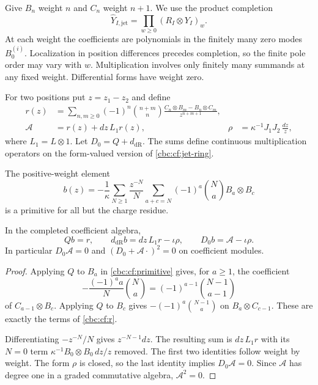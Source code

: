 Give $B_n$ weight $n$ and $C_n$ weight $n+1$. We use the
product completion
\begin{equation}\label{cbc:cf:jet-ring}
 \widehat Y_{I,\mathrm{jet}}
       =\prod_{w\geq0}(R_I\otimes Y_I)_w.
\end{equation}
At each weight the coefficients are polynomials in the finitely
many zero modes $B_0^{(i)}$. Localization in position differences
precedes completion, so the finite pole order may vary with $w$.
Multiplication involves only finitely many summands at any fixed
weight. Differential forms have weight zero.

For two positions put $z=z_1-z_2$ and define
\begin{align}
 r(z)&=\sum_{n,m\geq0}(-1)^n\binom{n+m}{n}
       \frac{C_n\otimes B_m-B_n\otimes C_m}{z^{n+m+1}},
       \label{cbc:cf:r}\\
 \mathcal A&=r(z)+dz\,L_1r(z),&
 \rho&=\kappa^{-1}J_1J_2\,\frac{dz}{z},
       \label{cbc:cf:connection}
\end{align}
where $L_1=L\otimes1$. Let $D_0=Q+d_{\mathrm{dR}}$.
The sums define continuous multiplication operators on the
form-valued version of \eqref{cbc:cf:jet-ring}.

The positive-weight element
\begin{equation}\label{cbc:cf:primitive}
 b(z)=-\frac1\kappa\sum_{N\geq1}\frac{z^{-N}}N
             \sum_{a+c=N}(-1)^a\binom Na B_a\otimes B_c
\end{equation}
is a primitive for all but the charge residue.

\begin{lemma}\label{cbc:cf:primitive-identity}
In the completed coefficient algebra,
\[
 Qb=r,\qquad
 d_{\mathrm{dR}}b=dz\,L_1r-\iota\rho,\qquad
 D_0b=\mathcal A-\iota\rho.
\]
In particular $D_0\mathcal A=0$ and
$(D_0+\mathcal A\cdot)^2=0$ on coefficient modules.
\end{lemma}
\begin{proof}
Applying $Q$ to $B_a$ in \eqref{cbc:cf:primitive} gives,
for $a\geq1$, the coefficient
\[
 -\frac{(-1)^aa}{N}\binom Na
       =(-1)^{a-1}\binom{N-1}{a-1}
\]
of $C_{a-1}\otimes B_c$. Applying $Q$ to $B_c$ gives
$-(-1)^a\binom{N-1}{a}$ on $B_a\otimes C_{c-1}$.
These are exactly the terms of \eqref{cbc:cf:r}.

Differentiating $-z^{-N}/N$ gives $z^{-N-1}dz$.
The resulting sum is $dz\,L_1r$ with its $N=0$ term
$\kappa^{-1}B_0\otimes B_0\,dz/z$ removed.
The first two identities follow weight by weight.
The form $\rho$ is closed, so the last identity implies
$D_0\mathcal A=0$. Since $\mathcal A$ has degree one
in a graded commutative algebra, $\mathcal A^2=0$.
\end{proof}

